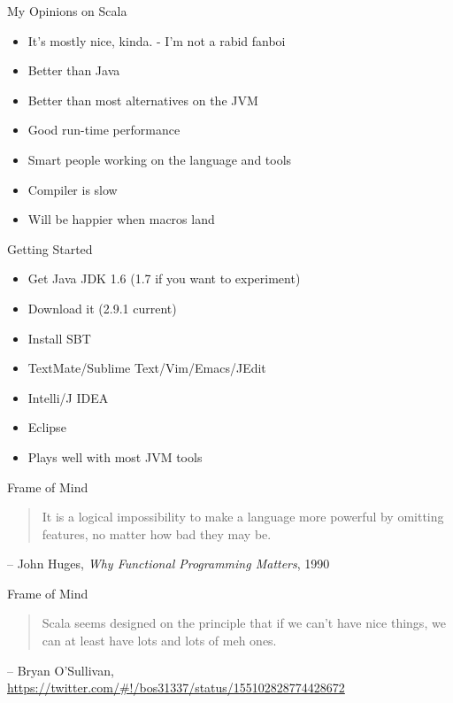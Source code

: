 \documentclass[14pt,t,usepdftitle=false,xcolornames=x11names,svgnames,dvipsnames,usenames]{beamer}
\begin{document}
\begin{frame}{My Opinions on Scala}
  \begin{itemize}[<+->]
    \item It's mostly nice, kinda. - I'm not a rabid fanboi
    \item Better than Java
    \item Better than most alternatives on the JVM
    \item Good run-time performance
    \item Smart people working on the language and tools
    \item Compiler is slow
    \item Will be happier when macros land
  \end{itemize}
\end{frame}

\begin{frame}{Getting Started}
  \begin{itemize}[<+->]
    \item Get Java JDK 1.6 (1.7 if you want to experiment)
    \item Download it (2.9.1 current)
    \item Install SBT
    \item TextMate/Sublime Text/Vim/Emacs/JEdit
    \item Intelli/J IDEA
    \item Eclipse
    \item Plays well with most JVM tools
  \end{itemize}
\end{frame}

\begin{frame}{Frame of Mind}
  \begin{quote}
    It is a logical impossibility to make a language more powerful
    by omitting features, no matter how bad they may be.
  \end{quote}
  \begin{flushright}
    \tiny{\textcolor{keyword}{-- John Huges, \emph{Why Functional Programming Matters}, 1990}}
  \end{flushright}
\end{frame}

\begin{frame}{Frame of Mind}
  \begin{quote}
    Scala seems designed on the principle that if we can't have nice
    things, we can at least have lots and lots of meh ones.
  \end{quote}
  \begin{flushright}
    \tiny{\textcolor{keyword}{-- Bryan O'Sullivan, \url{https://twitter.com/\#!/bos31337/status/155102828774428672}}}
  \end{flushright}
\end{frame}
\end{document}
